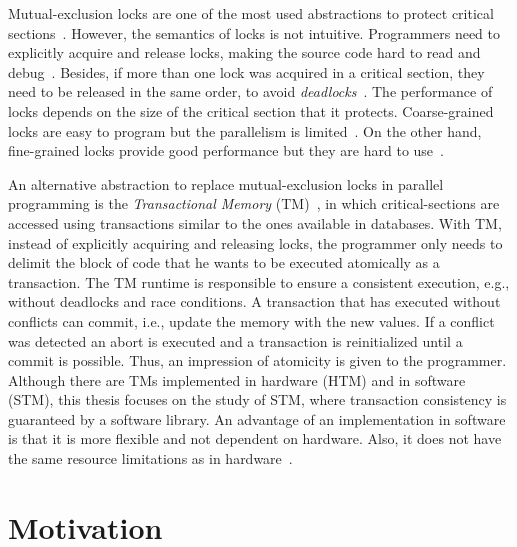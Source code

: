 Mutual-exclusion locks are one of the most used abstractions to protect critical sections~\cite{Fraser2007}. However, the semantics of locks is not intuitive.  Programmers need to explicitly acquire and release  locks, making the source code hard to read and debug~\cite{Anthes:2014}. Besides, if more than one lock was acquired in a critical section, they need to be released in the same order, to avoid \emph{deadlocks}~\cite{Herlihy:2008}. The performance of locks depends on the size of the critical section that it protects. Coarse-grained locks are easy to program but the parallelism is limited~\cite{TL2}. On the other hand, fine-grained locks provide good performance but they are hard to use~\cite{Dice:2007}.

An alternative abstraction to replace mutual-exclusion locks in  parallel programming is the \emph{Transactional Memory} (TM)~\cite{Harris:2010, Grahn:2010}, in which critical-sections are accessed using transactions similar to the ones available in databases. With TM, instead of explicitly acquiring and releasing locks, the programmer only needs to delimit the block of code that he wants to be executed atomically as a transaction. The TM runtime is responsible to ensure a consistent execution, e.g., without deadlocks and race conditions. A transaction that has executed without conflicts can commit, i.e., update the memory with the new values. If a conflict was detected an abort is executed and a transaction is reinitialized until a commit is possible. Thus, an impression of atomicity is given to the programmer. Although there are TMs implemented in hardware (HTM) and in software (STM), this thesis focuses on the study of STM, where transaction consistency is guaranteed by a software library. An advantage of an implementation in software is that it is more flexible and not dependent on hardware. Also, it does not have the same resource limitations as in hardware~\cite{Grahn:2010}.%

\section{Motivation}\label{sect:motivation}

